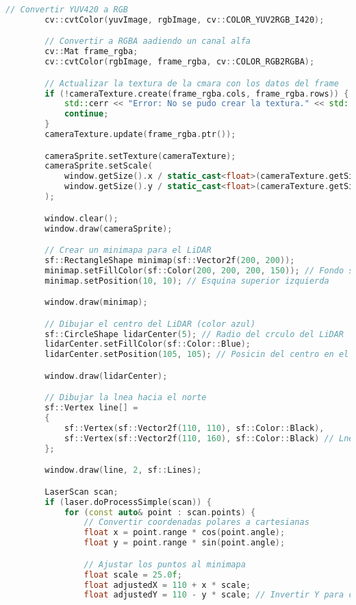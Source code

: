 \begin{lstlisting}[language={C++}, caption={Tercer ajuste de c\'odigo}, label={TercerAjuste}]
        // Convertir YUV420 a RGB
        cv::cvtColor(yuvImage, rgbImage, cv::COLOR_YUV2RGB_I420);

        // Convertir a RGBA aadiendo un canal alfa
        cv::Mat frame_rgba;
        cv::cvtColor(rgbImage, frame_rgba, cv::COLOR_RGB2RGBA);

        // Actualizar la textura de la cmara con los datos del frame
        if (!cameraTexture.create(frame_rgba.cols, frame_rgba.rows)) {
            std::cerr << "Error: No se pudo crear la textura." << std::endl;
            continue;
        }
        cameraTexture.update(frame_rgba.ptr());

        cameraSprite.setTexture(cameraTexture);
        cameraSprite.setScale(
            window.getSize().x / static_cast<float>(cameraTexture.getSize().x),
            window.getSize().y / static_cast<float>(cameraTexture.getSize().y)
        );

        window.clear();
        window.draw(cameraSprite);

        // Crear un minimapa para el LiDAR
        sf::RectangleShape minimap(sf::Vector2f(200, 200));
        minimap.setFillColor(sf::Color(200, 200, 200, 150)); // Fondo semitransparente
        minimap.setPosition(10, 10); // Esquina superior izquierda

        window.draw(minimap);

        // Dibujar el centro del LiDAR (color azul)
        sf::CircleShape lidarCenter(5); // Radio del crculo del LiDAR
        lidarCenter.setFillColor(sf::Color::Blue);
        lidarCenter.setPosition(105, 105); // Posicin del centro en el minimapa

        window.draw(lidarCenter);

        // Dibujar la lnea hacia el norte
        sf::Vertex line[] =
        {
            sf::Vertex(sf::Vector2f(110, 110), sf::Color::Black),
            sf::Vertex(sf::Vector2f(110, 160), sf::Color::Black) // Lnea hacia arriba (norte)
        };

        window.draw(line, 2, sf::Lines);

        LaserScan scan;
        if (laser.doProcessSimple(scan)) {
            for (const auto& point : scan.points) {
                // Convertir coordenadas polares a cartesianas
                float x = point.range * cos(point.angle);
                float y = point.range * sin(point.angle);

                // Ajustar los puntos al minimapa
                float scale = 25.0f;
                float adjustedX = 110 + x * scale;
                float adjustedY = 110 - y * scale; // Invertir Y para coordinar con la pantalla


\end{lstlisting}

